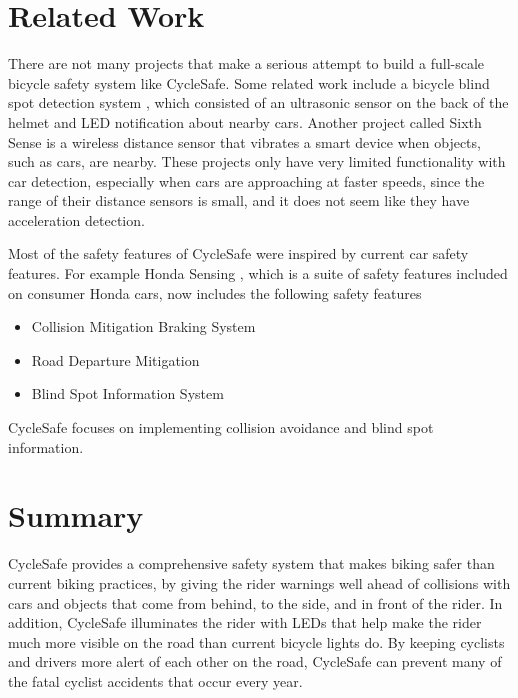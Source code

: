 \documentclass[journal]{IEEEtran}
\begin{document}
\section{Related Work}
There are not many projects that make a serious attempt to build a full-scale bicycle safety system like CycleSafe. Some related work include a bicycle blind spot detection system \cite{bicycle_blind_spot}, which consisted of an ultrasonic sensor on the back of the helmet and LED notification about nearby cars. Another project called Sixth Sense \cite{bicycle_sixth_sense} is a wireless distance sensor that vibrates a smart device when objects, such as cars, are nearby. These projects only have very limited functionality with car detection, especially when cars are approaching at faster speeds, since the range of their distance sensors is small, and it does not seem like they have acceleration detection.

Most of the safety features of CycleSafe were inspired by current car safety features. For example Honda Sensing \cite{honda_safety}, which is a suite of safety features included on consumer Honda cars, now includes the following safety features
\begin{itemize}
    \item Collision Mitigation Braking System
    \item Road Departure Mitigation
    \item Blind Spot Information System
\end{itemize}
CycleSafe focuses on implementing collision avoidance and blind spot information.

\section{Summary}
CycleSafe provides a comprehensive safety system that makes biking safer than current biking practices, by giving the rider warnings well ahead of collisions with cars and objects that come from behind, to the side, and in front of the rider. In addition, CycleSafe illuminates the rider with LEDs that help make the rider much more visible on the road than current bicycle lights do. By keeping cyclists and drivers more alert of each other on the road, CycleSafe can prevent many of the fatal cyclist accidents that occur every year.
\end{document}
